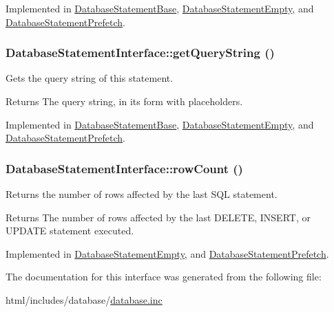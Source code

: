 Implemented in \hyperlink{classDatabaseStatementBase_ad80ef261e8934f5c69422f7530aa4cdc}{DatabaseStatementBase}, \hyperlink{classDatabaseStatementEmpty_a0cadfb54ef7906aaaf57d7278ab6bb27}{DatabaseStatementEmpty}, and \hyperlink{classDatabaseStatementPrefetch_a98e507b8baa0b5aaf80fd51bd7989491}{DatabaseStatementPrefetch}.\hypertarget{interfaceDatabaseStatementInterface_a2c248a565c623713d8e5ddf0ba83880d}{
\subsubsection[{getQueryString}]{\setlength{\rightskip}{0pt plus 5cm}DatabaseStatementInterface::getQueryString ()}}
\label{interfaceDatabaseStatementInterface_a2c248a565c623713d8e5ddf0ba83880d}
Gets the query string of this statement.

\begin{DoxyReturn}{Returns}
The query string, in its form with placeholders. 
\end{DoxyReturn}


Implemented in \hyperlink{classDatabaseStatementBase_afc56564e99ad8fe9c8c2549f77c37b3c}{DatabaseStatementBase}, \hyperlink{classDatabaseStatementEmpty_a14114ed9aed78af3b2ff03eb40840e7d}{DatabaseStatementEmpty}, and \hyperlink{classDatabaseStatementPrefetch_ae5a57e570b7c999b8b4c8b42c636d1af}{DatabaseStatementPrefetch}.\hypertarget{interfaceDatabaseStatementInterface_a97657e1cf89c6e1700f7bfa0e90deaf5}{
\subsubsection[{rowCount}]{\setlength{\rightskip}{0pt plus 5cm}DatabaseStatementInterface::rowCount ()}}
\label{interfaceDatabaseStatementInterface_a97657e1cf89c6e1700f7bfa0e90deaf5}
Returns the number of rows affected by the last SQL statement.

\begin{DoxyReturn}{Returns}
The number of rows affected by the last DELETE, INSERT, or UPDATE statement executed. 
\end{DoxyReturn}


Implemented in \hyperlink{classDatabaseStatementEmpty_aba97790d259fd594defbd52ff9f1037d}{DatabaseStatementEmpty}, and \hyperlink{classDatabaseStatementPrefetch_a03f64ac0f61a386a4f5a87540d254fa1}{DatabaseStatementPrefetch}.

The documentation for this interface was generated from the following file:\begin{DoxyCompactItemize}
\item 
html/includes/database/\hyperlink{database_8inc}{database.inc}\end{DoxyCompactItemize}
